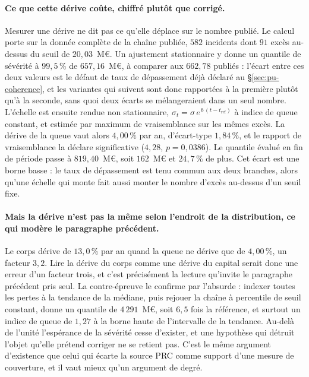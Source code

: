 \paragraph{Ce que cette dérive coûte, chiffré plutôt que corrigé.} Mesurer une dérive ne dit pas
ce qu'elle déplace sur le nombre publié. Le calcul porte sur la donnée complète de la chaîne
publiée, $582$ incidents dont $91$ excès au-dessus du seuil de $20{,}03$~M\euro. Un ajustement
stationnaire y donne un quantile de sévérité à $99{,}5\,\%$ de $657{,}16$~M\euro, à comparer aux
$662{,}78$ publiés : l'écart entre ces deux valeurs est le défaut de taux de dépassement déjà
déclaré au \S\ref{sec:pu-coherence}, et les variantes qui suivent sont donc rapportées à la
première plutôt qu'à la seconde, sans quoi deux écarts se mélangeraient dans un seul nombre.
L'échelle est ensuite rendue non stationnaire, $\sigma_t = \sigma\,e^{\,b\,(t-t_{\mathrm{ref}})}$
à indice de queue constant, et estimée par maximum de vraisemblance sur les mêmes excès. La
dérive de la queue vaut alors $4{,}00\,\%$ par an, d'écart-type $1{,}84\,\%$, et le rapport de
vraisemblance la déclare significative ($4{,}28$, $p=0{,}0386$). Le quantile évalué en fin de
période passe à $819{,}40$~M\euro, soit $162$~M\euro{} et $24{,}7\,\%$ de plus. Cet écart est une
borne basse : le taux de dépassement est tenu commun aux deux branches, alors qu'une
échelle qui monte fait aussi monter le nombre d'excès au-dessus d'un seuil fixe.

\paragraph{Mais la dérive n'est pas la même selon l'endroit de la distribution, ce qui modère le
paragraphe précédent.} Le corps dérive de $13{,}0\,\%$ par an quand la queue ne dérive que de
$4{,}00\,\%$, un facteur $3{,}2$. Lire la dérive du corps comme une dérive du capital serait donc
une erreur d'un facteur trois, et c'est précisément la lecture qu'invite le paragraphe précédent
pris seul. La contre-épreuve le confirme par l'absurde : indexer toutes les pertes à la tendance
de la médiane, puis rejouer la chaîne à percentile de seuil constant, donne un quantile de
$4\,291$~M\euro, soit $6{,}5$ fois la référence, et surtout un indice de queue de $1{,}27$ à la
borne haute de l'intervalle de la tendance. Au-delà de l'unité l'espérance de la sévérité cesse
d'exister, et une hypothèse qui détruit l'objet qu'elle prétend corriger ne se retient pas.
C'est le même argument d'existence que celui qui écarte la source PRC comme support d'une mesure
de couverture, et il vaut mieux qu'un argument de degré.

